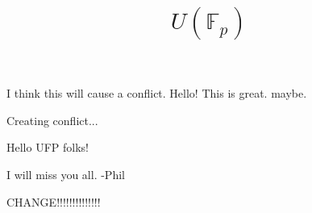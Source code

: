 \documentclass{amsart}
\begin{document}
I think this will cause a conflict. 
 Hello! This is great. maybe. 


    \title{$U(\mathbb{F}_p)$}

Creating conflict...

    \maketitle

 Hello UFP folks!
 
 I will miss you all. -Phil

CHANGE!!!!!!!!!!!!!!
\end{document}

